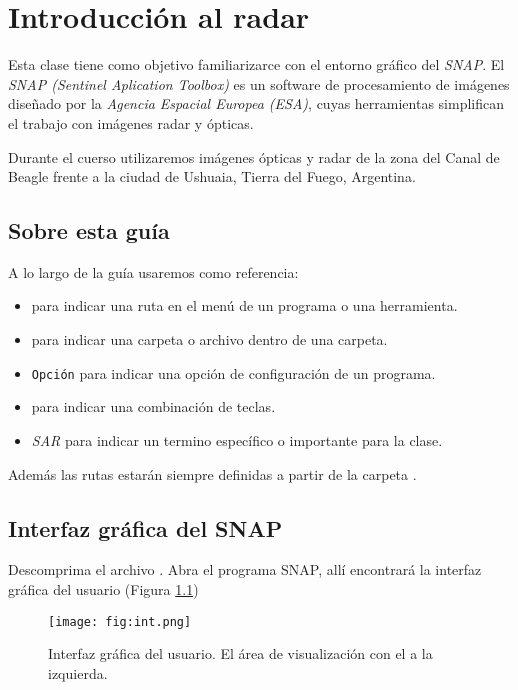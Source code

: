 \chapter{Introducción al radar}

Esta clase tiene como objetivo familiarizarce con el entorno gráfico del \emph{SNAP}. El \emph{SNAP (Sentinel Aplication Toolbox)} es un  software de procesamiento de imágenes diseñado por la \emph{Agencia Espacial Europea (ESA)}, cuyas herramientas simplifican el trabajo con imágenes radar y ópticas.

Durante el cuerso utilizaremos imágenes ópticas y radar de la zona del Canal de Beagle frente a la ciudad de Ushuaia, Tierra del Fuego, Argentina.

\section{Sobre esta guía}

A lo largo de la guía usaremos como referencia:

\begin{itemize}
  \item {} para indicar una ruta en el menú de un programa o una herramienta.
  \item {} para indicar una carpeta o archivo dentro de una carpeta.
  \item \texttt{Opción} para indicar una opción de configuración de un programa.
  \item {} para indicar una combinación de teclas.
  \item \emph{SAR} para indicar un termino específico o importante para la clase.
\end{itemize}

Además las rutas estarán siempre definidas a partir de la carpeta .

\section{Interfaz gráfica del SNAP}

Descomprima el archivo . Abra el programa SNAP, allí encontrará la interfaz gráfica del usuario (Figura \ref{fig:int})

\begin{figure}[h!]
    \centering
    \texttt{[image: fig:int.png]}
    \caption{Interfaz gráfica del usuario. El área de visualización con el  a la izquierda.}
    \label{fig:int}
\end{figure}

